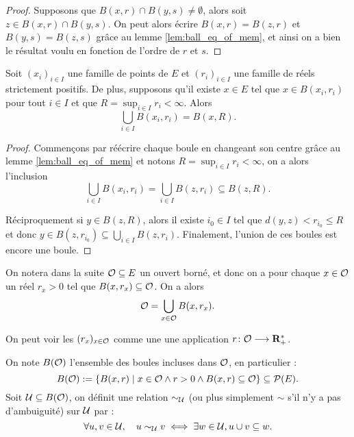 \documentclass[../../rapport.tex]{subfiles}
\begin{document}
  \begin{proof}
    Supposons que $B(x, r) \cap B(y, s) \not= \emptyset$, alors soit $z \in B(x, r) \cap B(y, s)$.
    On peut alors écrire $B(x, r) = B(z, r)$ et $B(y, s) = B(z, s)$ grâce au lemme \ref{lem:ball_eq_of_mem},
    et ainsi on a bien le résultat voulu en fonction de l'ordre de $r$ et $s$.
  \end{proof}

  \begin{lemma}
    \label{lem:union_mem_balls}
    Soit $(x_i)_{i\in I}$ une famille de points de $E$ et $(r_i)_{i\in I}$ une famille de réels strictement positifs.
    De plus, supposons qu'il existe $x \in E$ tel que $x \in B(x_i, r_i)$ pour tout $i \in I$ et que $R = \sup_{i\in I}{r_i} < \infty$.
    Alors
    $$\bigcup_{i \in I}B(x_i, r_i) = B(x, R).$$
  \end{lemma}

  \begin{proof}
    Commençons par réécrire chaque boule en changeant son centre grâce au lemme \ref{lem:ball_eq_of_mem} et
    notons $R = \sup_{i\in I}{r_i} < \infty$, on a alors l'inclusion
    $$\bigcup_{i\in I}B(x_i, r_i) = \bigcup_{i\in I}{B(z, r_i)} \subseteq B(z, R).$$

    Réciproquement si $y \in B(z, R)$, alors il existe $i_0 \in I$ tel que $d(y, z) < r_{i_0} \le R$
    et donc $y \in B(z, r_{i_0}) \subseteq \bigcup_{i\in I}{B(z, r_i)}$.
    Finalement, l'union de ces boules est encore une boule.
  \end{proof}

  On notera dans la suite $\mathcal{O} \subseteq E$ un ouvert borné,
  et donc on a pour chaque $x \in \mathcal{O}$ un réel $r_x > 0$ tel que $B(x, r_x) \subseteq \mathcal{O}$.
  On a alors
  $$\mathcal{O} = \bigcup_{x\in\mathcal{O}}{B(x, r_x)}.$$

  \begin{remark}
    On peut voir les $(r_x)_{x\in\mathcal{O}}$ comme une une application $r \colon \mathcal{O} \longrightarrow \mathbf R^*_+$.
  \end{remark}

  \begin{definition}
    On note $B(\mathcal{O})$ l'ensemble des boules incluses dans $\mathcal{O}$, en particulier :
    $$B(\mathcal{O}) := \left\{B(x, r) \mid x \in \mathcal{O} \land r > 0 \land B(x, r) \subseteq \mathcal{O}\right\} \subseteq \mathcal{P}(E).$$
    Soit $\mathcal U \subseteq B(\mathcal{O})$, on définit une relation $\sim_{\mathcal U}$ (ou plus simplement $\sim$ s'il n'y a pas d'ambuiguité) sur $\mathcal U$ par :
    $$\forall u, v \in \mathcal U, \hspace{1em} u \sim_{\mathcal U} v \iff \exists w \in \mathcal U, u \cup v \subseteq w.$$
  \end{definition}
\end{document}
